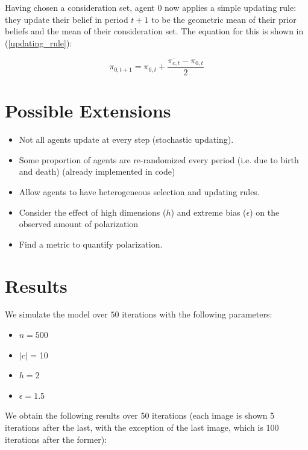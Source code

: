 \documentclass{article}
\begin{document}
Having chosen a consideration set, agent 0 now applies a simple updating rule: they update their belief in period $t+1$ to be the geometric mean of their prior beliefs and the mean of their consideration set. The equation for this is shown in (\ref{updating_rule}):

\begin{equation}
    \pi_{0, t+1} = \pi_{0, t} + \frac{\overline{\pi_{c, t}} - \pi_{0, t}}{2}
    \label{updating_rule}
\end{equation}

\section{Possible Extensions}

\begin{itemize}
    \item Not all agents update at every step (stochastic updating).
    \item Some proportion of agents are re-randomized every period (i.e. due to birth and death) (already implemented in code)
    \item Allow agents to have heterogeneous selection and updating rules.
    \item Consider the effect of high dimensions ($h$) and extreme bias ($\epsilon$) on the observed amount of polarization 
    \item Find a metric to quantify polarization.
\end{itemize}

\section{Results}
We simulate the model over $50$ iterations with the following parameters:

\begin{itemize}
    \item $n = 500$
    \item $|c|$ = 10
    \item $h = 2$
    \item $\epsilon = 1.5$ 
\end{itemize}

We obtain the following results over 50 iterations (each image is shown 5 iterations after the last, with the exception of the last image, which is 100 iterations after the former):
\end{document}
